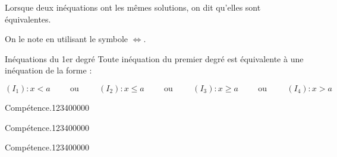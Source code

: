 \begin{pageCours}
\begin{Def}
Lorsque deux inéquations ont les mêmes solutions, on dit qu'elles sont équivalentes.

On le note en utilisant le symbole $\Leftrightarrow$.
\end{Def}

\begin{PpT}{Inéquations du 1er degré}
Toute inéquation du premier degré est équivalente à une inéquation de la forme : 

\[(I_1):x<a \hspace{1cm} \text{ou} \hspace{1cm} (I_2):x\leq a \hspace{1cm} \text{ou} \hspace{1cm} (I_3):x\geq a \hspace{1cm} \text{ou} \hspace{1cm} (I_4):x>a\]
\end{PpT}

\end{pageCours} %


\begin{pageAD}  %
\restoregeometry %


\begin{ExoCad}{Compétence.}{1234}{0}{0}{0}{0}{0}

\end{ExoCad}


\begin{ExoCad}{Compétence.}{1234}{0}{0}{0}{0}{0}

\end{ExoCad}


\begin{ExoCad}{Compétence.}{1234}{0}{0}{0}{0}{0}

\end{ExoCad}
 
\end{pageAD} %



